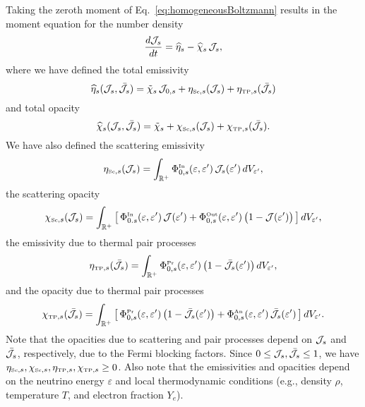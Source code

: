 \documentclass[12pt]{article}
\newcommand{\IN}{\mbox{\tiny In}}
\newcommand{\PROD}{\mbox{\tiny Pr}}
\newcommand{\ANN}{\mbox{\tiny An}}
\newcommand{\SC}{\mbox{\tiny Sc}}      %
\newcommand{\TP}{\mbox{\tiny TP}}      %
\begin{document}
Taking the zeroth moment of Eq.~\eqref{eq:homogeneousBoltzmann} results in the moment equation for the number density
\begin{equation}
  \frac{d \mathcal{J}_{s}}{d t}
  =\widehat{\eta}_{s} - \widehat{\chi}_{s}\,\mathcal{J}_{s},
  \label{eq:momentNumber}
\end{equation}
where we have defined the total emissivity
\begin{equation}
  \widehat{\eta}_{s}(\cJ_{s},\bar{\cJ}_{s})
  =\tilde{\chi}_{s}\,\cJ_{0,s} + \eta_{\SC,s}(\cJ_{s}) + \eta_{\TP,s}(\bar{\cJ}_{s})
\end{equation}
and total opacity
\begin{equation}
  \widehat{\chi}_{s}(\cJ_{s},\bar{\cJ}_{s})
  =\tilde{\chi}_{s} + \chi_{\SC,s}(\cJ_{s}) + \chi_{\TP,s}(\bar{\cJ}_{s}).  
\end{equation}
We have also defined the scattering emissivity
\begin{equation}
  \eta_{\SC,s}(\cJ_{s})
  =\int_{\bbR^{+}}\Phi_{0,s}^{\IN}(\varepsilon,\varepsilon')\,\cJ_{s}(\varepsilon')\,dV_{\varepsilon'},
\end{equation}
the scattering opacity
\begin{equation}
  \chi_{\SC,s}(\cJ_{s})
  =\int_{\bbR^{+}}\big[\,\Phi_{0.s}^{\IN}(\varepsilon,\varepsilon')\,\cJ(\varepsilon')+\Phi_{0,s}^{\Out}(\varepsilon,\varepsilon')\,\big(1-\cJ(\varepsilon')\big)\,\big]\,dV_{\varepsilon'},
\end{equation}
the emissivity due to thermal pair processes
\begin{equation}
  \eta_{\TP,s}(\bar{\cJ}_{s})
  =\int_{\bbR^{+}}\Phi_{0,s}^{\PROD}(\varepsilon,\varepsilon')\,\big(1-\bar{\cJ}_{s}(\varepsilon')\big)\,dV_{\varepsilon'},
\end{equation}
and the opacity due to thermal pair processes
\begin{equation}
  \chi_{\TP,s}(\bar{\cJ}_{s})
  =\int_{\bbR^{+}}\big[\,\Phi_{0,s}^{\PROD}(\varepsilon,\varepsilon')\,\big(1-\bar{\cJ}_{s}(\varepsilon')\big)+\Phi_{0,s}^{\ANN}(\varepsilon,\varepsilon')\,\bar{\cJ}_{s}(\varepsilon')\,\big]\,dV_{\varepsilon'}.  
\end{equation}
Note that the opacities due to scattering and pair processes depend on $\mathcal{J}_{s}$ and $\bar{\mathcal{J}}_{s}$, respectively, due to the Fermi blocking factors.  
Since $0\le\mathcal{J}_{s},\bar{\mathcal{J}}_{s}\le1$, we have $\eta_{\SC,s},\chi_{\SC,s},\eta_{\TP,s},\chi_{\TP,s}\ge0$.  
Also note that the emissivities and opacities depend on the neutrino energy $\varepsilon$ and local thermodynamic conditions (e.g., density $\rho$, temperature $T$, and electron fraction $Y_{e}$).  
\end{document}
